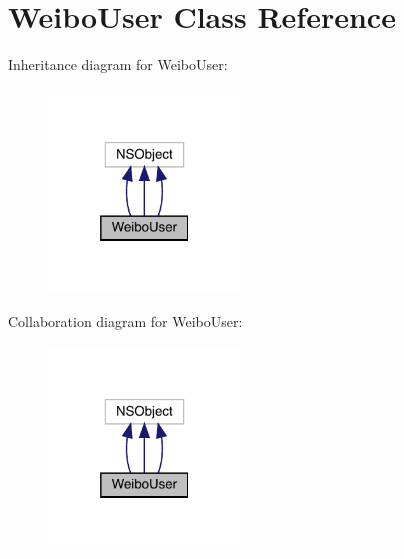\hypertarget{interface_weibo_user}{}\section{Weibo\+User Class Reference}
\label{interface_weibo_user}


Inheritance diagram for Weibo\+User\+:\nopagebreak
\begin{figure}[H]
\begin{center}
\leavevmode
\includegraphics[width=145pt]{interface_weibo_user__inherit__graph}
\end{center}
\end{figure}


Collaboration diagram for Weibo\+User\+:\nopagebreak
\begin{figure}[H]
\begin{center}
\leavevmode
\includegraphics[width=145pt]{interface_weibo_user__coll__graph}
\end{center}
\end{figure}
